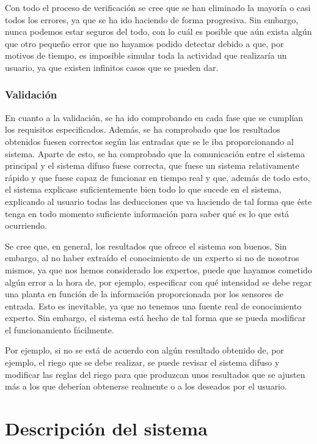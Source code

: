 \documentclass[11pt,a4paper]{article}
\begin{document}
Con todo el proceso de verificación se cree que se han eliminado la mayoría o casi todos los errores, ya que se ha ido haciendo de
forma progresiva. Sin embargo, nunca podemos estar seguros del todo, con lo cuál es posible que aún exista algún que otro pequeño
error que no hayamos podido detectar debido a que, por motivos de tiempo, es imposible simular toda la actividad que realizaría
un usuario, ya que existen infinitos casos que se pueden dar.

\subsubsection{Validación}

En cuanto a la validación, se ha ido comprobando en cada fase que se cumplían los requisitos especificados. Además, se ha comprobado
que los resultados obtenidos fuesen correctos según las entradas que se le iba proporcionando al sistema. Aparte de esto, se
ha comprobado que la comunicación entre el sistema principal y el sistema difuso fuese correcta, que fuese un sistema relativamente
rápido y que fuese capaz de funcionar en tiempo real y que, además de todo esto, el sistema explicase suficientemente bien todo lo
que sucede en el sistema, explicando al usuario todas las deducciones que va haciendo de tal forma que éste tenga en todo momento
suficiente información para saber qué es lo que está ocurriendo.

Se cree que, en general, los resultados que ofrece el sistema son buenos. Sin embargo, al no haber extraído el conocimiento de
un experto si no de nosotros mismos, ya que nos hemos considerado los expertos, puede que hayamos cometido algún error a la hora de,
por ejemplo, especificar con qué intensidad se debe regar una planta en función de la información proporcionada por los sensores
de entrada. Esto es inevitable, ya que no tenemos una fuente real de conocimiento experto. Sin embargo, el sistema está hecho de tal
forma que se pueda modificar el funcionamiento fácilmente.

Por ejemplo, si no se está de acuerdo con algún resultado obtenido de, por ejemplo, el riego que se debe realizar, se puede revisar
el sistema difuso y modificar las reglas del riego para que produzcan unos resultados que se ajusten más a los que deberían
obtenerse realmente o a los deseados por el usuario.

\newpage

\section{Descripción del sistema}
\end{document}
